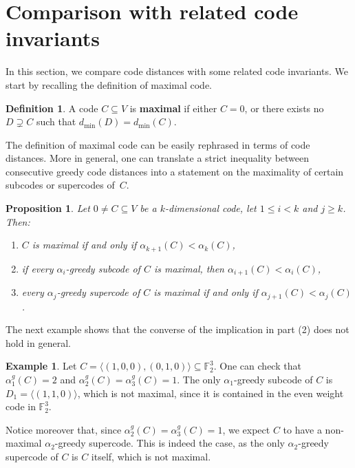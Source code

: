 \documentclass[12pt]{amsart}
\numberwithin{equation}{section}
\newtheorem{proposition}[theorem]{Proposition}
\theoremstyle{definition}
\newtheorem{definition}[theorem]{Definition}
\newtheorem{example}[theorem]{Example}
\newcommand{\FF}{\mathbb{F}}
\begin{document}
\section{Comparison with related code invariants}\label{comparison}

In this section, we compare code distances with some related code invariants. We start by recalling the definition of maximal code.

\begin{definition}
A code $C\subseteq V$ is {\bf maximal} if either $C=0$, or there exists no $D\supsetneq C$ such that $d_{\min}(D)=d_{\min}(C)$. 
\end{definition}

The definition of maximal code can be easily rephrased in terms of code distances. More in general, one can translate a strict inequality between consecutive greedy code distances into a statement on the maximality of certain subcodes or supercodes of~$C$.

\begin{proposition}
Let $0\neq C\subseteq V$ be a $k$-dimensional code, let $1\leq i<k$ and $j\geq k$. Then:
\begin{enumerate}
\item $C$ is maximal if and only if $\alpha_{k+1}(C)<\alpha_k(C)$,
\item if every $\alpha_i$-greedy subcode of $C$ is maximal, then $\alpha_{i+1}(C)<\alpha_i(C)$,
\item every $\alpha_j$-greedy supercode of $C$ is maximal if and only if $\alpha_{j+1}(C)<\alpha_j(C)$.
\end{enumerate}
\end{proposition}

The next example shows that the converse of the implication in part (2) does not hold in general.

\begin{example}
Let $C=\langle(1,0,0),(0,1,0)\rangle\subseteq\FF_2^3$. One can check that $\alpha_1^g(C)=2$ and $\alpha_2^g(C)=\alpha_3^g(C)=1$. The only $\alpha_1$-greedy subcode of $C$ is $D_1=\langle(1,1,0)\rangle$, which is not maximal, since it is contained in the even weight code in $\FF_2^3$. 

Notice moreover that, since $\alpha_2^g(C)=\alpha_3^g(C)=1$, we expect $C$ to have a non-maximal $\alpha_2$-greedy supercode. This is indeed the case, as the only $\alpha_2$-greedy supercode of $C$ is $C$ itself, which is not maximal.
\end{example}
\end{document}
